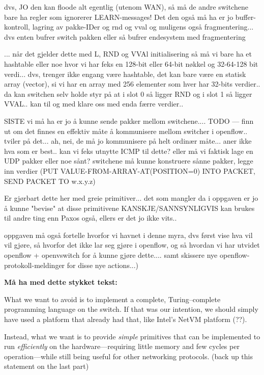 dvs, JO den kan floode alt egentlig (utenom WAN), så må de
andre switchene bare ha regler som ignorerer LEARN-messages! Det den også må
ha er jo buffer-kontroll, lagring av pakke-IDer og rnd og vval og muligens
også fragmentering...  dvs enten bufrer switch pakken eller så bufrer
endesystem med fragmentering

... når det gjelder dette med L, RND og VVAl initialisering så må vi bare ha
et hashtable eller noe hvor vi har feks en 128-bit eller 64-bit nøkkel og
32-64-128 bit verdi... dvs, trenger ikke engang være hashtable, det kan bare
være en statisk array (vector), si vi har en array med 256 elementer som
hver har 32-bits verdier.. da kan switchen selv holde styr på at i slot 0 så
ligger RND og i slot 1 så ligger VVAL.. kan til og med klare oss med enda
færre verdier..

SISTE vi må ha er jo å kunne sende pakker mellom switchene....
TODO --- finn ut om det finnes en effektiv måte å kommunisere mellom
switcher i openflow.. tviler på det... ah, nei, de må jo kommunisere på helt
ordinær måte... aner ikke hva som er best.. kan vi feks utnytte ICMP til
dette? eller må vi faktisk lage en UDP pakker eller noe sånt?
switchene må kunne konstruere sånne pakker, legge inn verdier
(PUT VALUE-FROM-ARRAY-AT(POSITION=0) INTO PACKET, SEND PACKET TO w.x.y.z)

Er gjørbart dette her med greie primitiver... det som mangler da i oppgaven
er jo å kunne "bevise" at disse primitivene KANSKJE/SANNSYNLIGVIS kan brukes
til andre ting enn Paxos også, ellers er det jo ikke vits..

oppgaven må også fortelle hvorfor vi havnet i denne myra, dvs først vise hva
vil vil gjøre, så hvorfor det ikke lar seg gjøre i openflow, og så hvordan
vi har utvidet openflow + openvswitch for å kunne gjøre dette....
samt skissere nye openflow-protokoll-meldinger for disse nye actions...)

\textbf{Må ha med dette stykket tekst:}

What we want to avoid is to implement a complete, Turing--complete
programming language on the switch.  If that was our intention, we should
simply have used a platform that already had that, like Intel's NetVM
platform (??).

Instead, what we want is to provide \textit{simple} primitives that can be
implemented to run \textit{efficiently} on the hardware---requiring little
memory and few cycles per operation---while still being useful for other
networking protocols. (back up this statement on the last part)

